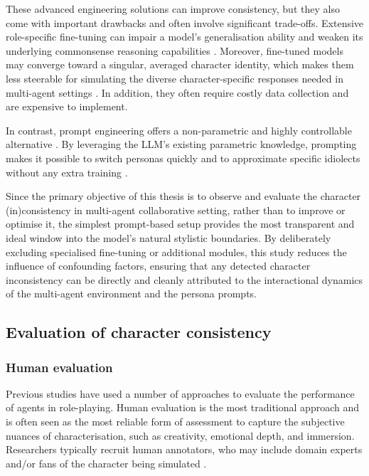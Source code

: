 \documentclass{article}
\begin{document}
These advanced engineering solutions can improve consistency, but they also come with important drawbacks and often involve significant trade-offs. Extensive role-specific fine-tuning can impair a model's generalisation ability and weaken its underlying commonsense reasoning capabilities \citep{ji2025enhancing}. Moreover, fine-tuned models may converge toward a singular, averaged character identity, which makes them less steerable for simulating the diverse character-specific responses needed in multi-agent settings \citep{park2023generative, moon2024anthology}. In addition, they often require costly data collection and are expensive to implement.

In contrast, prompt engineering offers a non-parametric and highly controllable alternative \citep{chen2024review}. By leveraging the LLM's existing parametric knowledge, prompting makes it possible to switch personas quickly and to approximate specific idiolects without any extra training \citep{santurkar2023opinions, moon2024anthology, wang2024rolellm, yuan2024evaluating}. 

Since the primary objective of this thesis is to observe and evaluate the character (in)consistency in multi-agent collaborative setting, rather than to improve or optimise it, the simplest prompt-based setup provides the most transparent and ideal window into the model's natural stylistic boundaries. By deliberately excluding specialised fine-tuning or additional modules, this study reduces the influence of confounding factors, ensuring that any detected character inconsistency can be directly and cleanly attributed to the interactional dynamics of the multi-agent environment and the persona prompts.


\subsection{Evaluation of character consistency} \label{sec:background_eval}

\subsubsection{Human evaluation} \label{sec:background_eval_human}

Previous studies have used a number of approaches to evaluate the performance of agents in role-playing. Human evaluation is the most traditional approach and is often seen as the most reliable form of assessment to capture the subjective nuances of characterisation, such as creativity, emotional depth, and immersion. Researchers typically recruit human annotators, who may include domain experts and/or fans of the character being simulated \citep{chen2023hp}.
\end{document}

